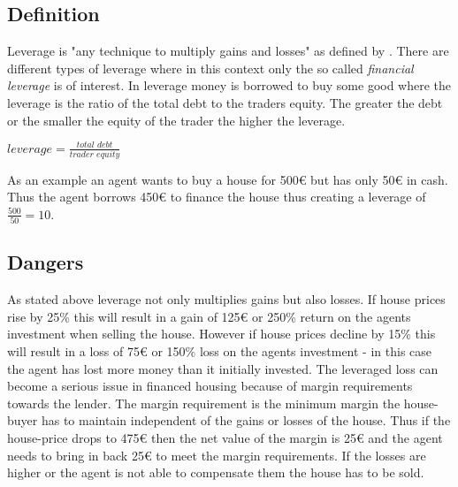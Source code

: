 \documentclass[../Bachelorarbeit.tex]{subfiles}
\begin{document}
\subsection{Definition}

Leverage is "any technique to multiply gains and losses" as defined by \cite{Brigham2012}. There are different types of leverage where in this context only the so called \textit{financial leverage} is of interest. In leverage money is borrowed to buy some good where the leverage is the ratio of the total debt to the traders equity. The greater the debt or the smaller the equity of the trader the higher the leverage.

\begin{center}
$leverage = \frac{\textit{total debt}}{\textit{trader equity}}$
\end{center}

\medskip

As an example an agent wants to buy a house for 500\euro{} but has only 50\euro{} in cash. Thus the agent borrows 450\euro{} to finance the house thus creating a leverage of $\frac{500}{50} = 10$.

\subsection{Dangers}
As stated above leverage not only multiplies gains but also losses. If house prices rise by 25\% this will result in a gain of 125\euro{} or 250\% return on the agents investment when selling the house. However if house prices decline by 15\% this will result in a loss of 75\euro{} or 150\% loss on the agents investment - in this case the agent has lost more money than it initially invested. The leveraged loss can become a serious issue in financed housing because of margin requirements towards the lender. The margin requirement is the minimum margin the house-buyer has to maintain independent of the gains or losses of the house. Thus if the house-price drops to 475\euro{} then the net value of the margin is 25\euro{} and the agent needs to bring in back 25\euro{} to meet the margin requirements. If the losses are higher or the agent is not able to compensate them the house has to be sold. 


\end{document}
